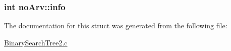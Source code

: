 \subsubsection[{\texorpdfstring{info}{info}}]{\setlength{\rightskip}{0pt plus 5cm}int no\+Arv\+::info}\hypertarget{structnoArv_a024fbe9c9e750cab832562b09d49200e}{}\label{structnoArv_a024fbe9c9e750cab832562b09d49200e}


The documentation for this struct was generated from the following file\+:\begin{DoxyCompactItemize}
\item 
\hyperlink{BinarySearchTree2_8c}{Binary\+Search\+Tree2.\+c}\end{DoxyCompactItemize}
